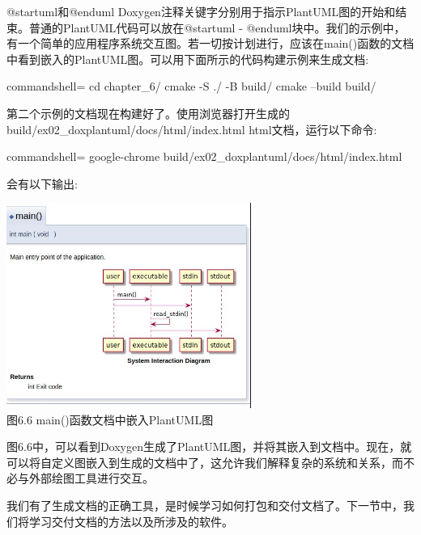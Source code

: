 @startuml和@enduml Doxygen注释关键字分别用于指示PlantUML图的开始和结束。普通的PlantUML代码可以放在@startuml - @enduml块中。我们的示例中，有一个简单的应用程序系统交互图。若一切按计划进行，应该在main()函数的文档中看到嵌入的PlantUML图。可以用下面所示的代码构建示例来生成文档:
 
\begin{tcblisting}{commandshell={}}
cd chapter_6/
cmake -S ./ -B build/
cmake --build build/
\end{tcblisting}

第二个示例的文档现在构建好了。使用浏览器打开生成的build/ex02\_doxplantuml/docs/html/index.html html文档，运行以下命令:

\begin{tcblisting}{commandshell={}}
google-chrome build/ex02_doxplantuml/docs/html/index.html
\end{tcblisting}

会有以下输出:

\begin{center}
\includegraphics[width=0.6\textwidth]{content/2/chapter6/images/6.jpg}\\
图6.6  main()函数文档中嵌入PlantUML图
\end{center}

图6.6中，可以看到Doxygen生成了PlantUML图，并将其嵌入到文档中。现在，就可以将自定义图嵌入到生成的文档中了，这允许我们解释复杂的系统和关系，而不必与外部绘图工具进行交互。

我们有了生成文档的正确工具，是时候学习如何打包和交付文档了。下一节中，我们将学习交付文档的方法以及所涉及的软件。








